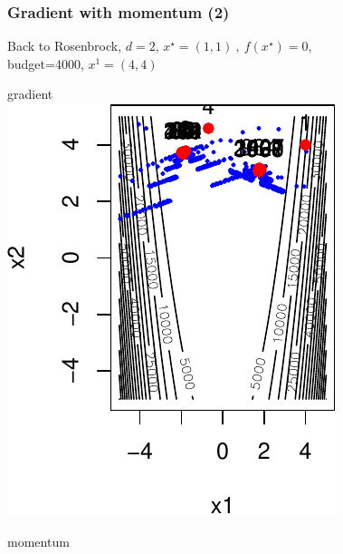 \documentclass[12pt]{beamer}
\begin{document}
\begin{frame}
\frametitle{Gradient with momentum (2)} 
Back to Rosenbrock, $d=2$, $x^\star = (1,1) ~,~ f(x^\star) = 0$,\\ 
budget=4000, $x^1=(4,4)$
\vspace{-0.3cm}
\begin{center}
\begin{minipage}[c]{0.35\textwidth}
\begin{center}
gradient\\
\includegraphics[width=\textwidth]{gradient_rosen_LS_budg4000_x-crop.pdf} 
\end{center}
\end{minipage}
\begin{minipage}[c]{0.35\textwidth}
\begin{center}
momentum\\

\end{center}
\end{minipage}
\end{center}
\end{frame}
\end{document}
